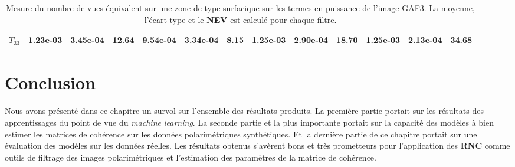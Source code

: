 \begin{table}[!htbp]
\begin{tabular}{c|c|c|c|c|c|c|c|c|c|c|c|c|}
\multicolumn{1}{|c|}{\textbf{$T_{33}$}} & 1.23e-03                      & 3.45e-04                         & \textbf{12.64}                & 9.54e-04                          & 3.34e-04                            & 8.15                             & 1.25e-03                            & 2.90e-04                               & \textbf{18.70}                      & 1.25e-03                         & 2.13e-04                            & \textbf{34.68}                  \\ \hline
\end{tabular}
\caption{\small{Mesure du nombre de vues équivalent sur une zone de type surfacique sur les termes en puissance de l'image GAF3.  La moyenne, l'écart-type et le \textbf{NEV} est calculé pour chaque filtre.}}
\label{tab:gaf3_results_table}
\end{table}


\section{Conclusion}

Nous avons présenté dans ce chapitre un survol sur l'ensemble des résultats produits. La première partie portait sur les résultats des apprentissages du point de vue du \textit{machine learning}.  La seconde partie et la plus importante portait sur la capacité des modèles à bien estimer les matrices de cohérence sur les données polarimétriques synthétiques.  Et la dernière partie de ce chapitre portait sur une évaluation des modèles sur les données réelles.  Les résultats obtenus s'avèrent bons et très prometteurs pour l'application des \textbf{RNC} comme outils de filtrage des images polarimétriques et l'estimation des paramètres de la matrice de cohérence.